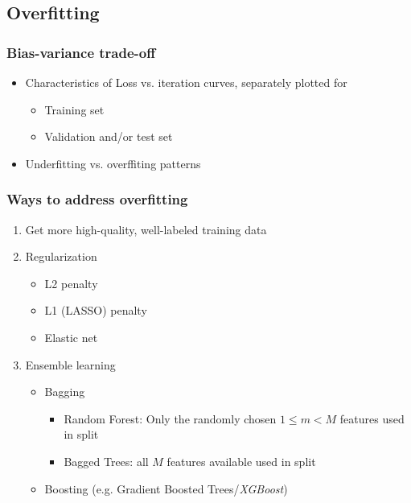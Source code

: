 \documentclass[10pt,landscape,letterpaper]{cheatsheet}
\begin{document}
\begin{multicols}{3}
\subsection{Overfitting}

\subsubsection{Bias-variance trade-off}

\begin{itemize}
    \item Characteristics of Loss vs. iteration curves, separately plotted for
    \begin{itemize}
        \item Training set
        \item Validation and/or test set
    \end{itemize}
    \item Underfitting vs. overffiting patterns
\end{itemize}

\subsubsection{Ways to address overfitting}

\begin{enumerate}
    \item Get more high-quality, well-labeled training data
    \item Regularization
    \begin{itemize}
        \item L2 penalty
        \item L1 (LASSO) penalty
        \item Elastic net
    \end{itemize}
    \item Ensemble learning
    \begin{itemize}
        \item Bagging
        \begin{itemize}
            \item Random Forest: Only the randomly chosen $1 \leq m < M$ features used in split
            \item Bagged Trees: all $M$ features available used in split
        \end{itemize}
        \item Boosting (e.g. Gradient Boosted Trees/\emph{XGBoost})
    \end{itemize}
\end{enumerate}


\end{multicols}
\end{document}
